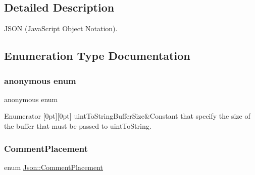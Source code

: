 \subsection{Detailed Description}
J\+S\+ON (Java\+Script Object Notation). 

\subsection{Enumeration Type Documentation}
\mbox{\label{namespaceJson_a2aacab54ef6fc18e833fbd4982a0a23a}} 
\subsubsection{\texorpdfstring{anonymous enum}{anonymous enum}}
{\footnotesize\ttfamily anonymous enum}

\begin{DoxyEnumFields}{Enumerator}
[0pt][0pt]{}\mbox{\label{namespaceJson_a2aacab54ef6fc18e833fbd4982a0a23aae4f2008c7919f20d81286121d1374424}} 
uint\+To\+String\+Buffer\+Size&Constant that specify the size of the buffer that must be passed to uint\+To\+String. \\
\hline

\end{DoxyEnumFields}
\mbox{\label{namespaceJson_a4fc417c23905b2ae9e2c47d197a45351}} 
\subsubsection{\texorpdfstring{Comment\+Placement}{CommentPlacement}}
{\footnotesize\ttfamily enum \hyperlink{namespaceJson_a4fc417c23905b2ae9e2c47d197a45351}{Json\+::\+Comment\+Placement}}

